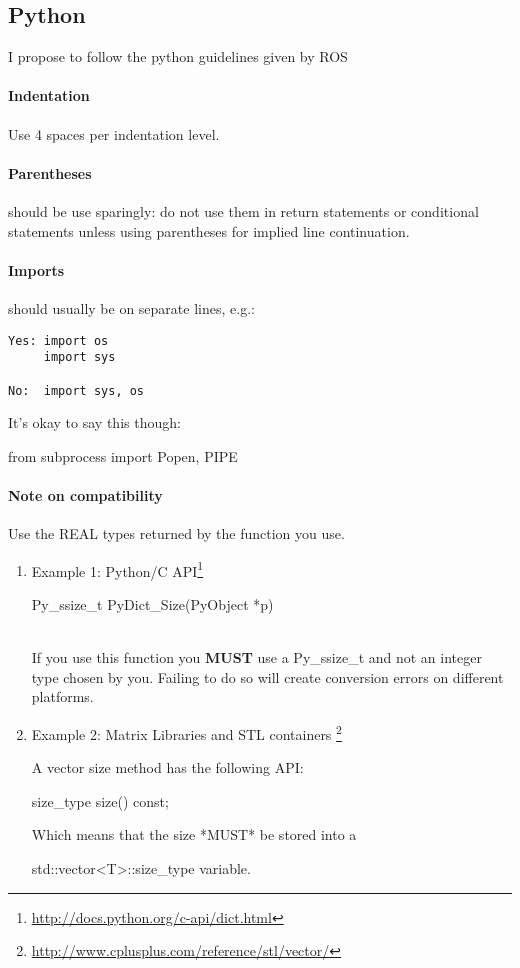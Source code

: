 \subsection{Python}
I propose to follow the python guidelines given by ROS \url{}

\paragraph{Indentation} Use 4 spaces per indentation level.

\paragraph{Parentheses} should be use sparingly: do not use them in return statements or conditional statements unless using parentheses for implied line continuation. %

\paragraph{Imports} should usually be on separate lines, e.g.:
\begin{verbatim}
Yes: import os
     import sys

No:  import sys, os
\end{verbatim}

It's okay to say this though:\\
\begin{tt}
from subprocess import Popen, PIPE
\end{tt}

\paragraph{Note on compatibility}
Use the REAL types returned by the function you use.
\begin{enumerate}
\item Example 1: Python/C API\footnote{\url{http://docs.python.org/c-api/dict.html}}\\
\begin{tt}Py\_ssize\_t PyDict\_Size(PyObject *p)\end{tt}\\
If you use this function you \textbf{MUST} use a Py\_ssize\_t and not an
integer type chosen by you.
Failing to do so will create conversion errors on different platforms.

\item Example 2: Matrix Libraries and STL containers
\footnote{\url{http://www.cplusplus.com/reference/stl/vector/}}

A vector size method has the following API:
\begin{tt}size\_type size() const;\end{tt}

Which means that the size *MUST* be stored into a
\begin{tt}std::vector<T>::size\_type variable.\end{tt}
\end{enumerate}



